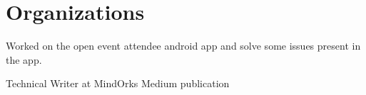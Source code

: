 \documentclass[]{deedy-resume-openfont}
\begin{document}
\begin{minipage}[t]{0.66\textwidth}




\section{Organizations} 

\begin{tightemize}\item Worked on the open event attendee android app and solve some issues present in the app.
\end{tightemize}
\sectionsep

\begin{tightemize}\item Technical Writer at MindOrks Medium publication
\end{tightemize}
\sectionsep




\end{minipage} 
\end{document}
